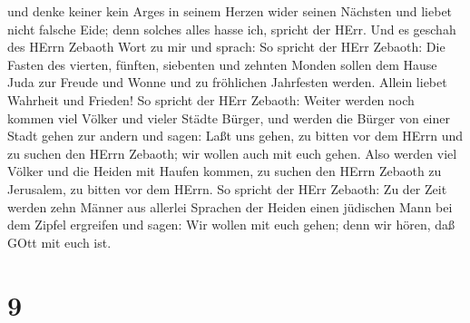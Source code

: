  und denke keiner kein Arges in seinem Herzen wider seinen
Nächsten und liebet nicht falsche Eide; denn solches alles hasse ich,
spricht der HErr.  Und es geschah des HErrn Zebaoth Wort zu
mir und sprach:  So spricht der HErr Zebaoth: Die Fasten
des vierten, fünften, siebenten und zehnten Monden sollen dem Hause Juda
zur Freude und Wonne und zu fröhlichen Jahrfesten werden. Allein liebet
Wahrheit und Frieden!  So spricht der HErr Zebaoth: Weiter
werden noch kommen viel Völker und vieler Städte Bürger, 
und werden die Bürger von einer Stadt gehen zur andern und sagen: Laßt
uns gehen, zu bitten vor dem HErrn und zu suchen den HErrn Zebaoth; wir
wollen auch mit euch gehen.  Also werden viel Völker und
die Heiden mit Haufen kommen, zu suchen den HErrn Zebaoth zu Jerusalem,
zu bitten vor dem HErrn.  So spricht der HErr Zebaoth: Zu
der Zeit werden zehn Männer aus allerlei Sprachen der Heiden einen
jüdischen Mann bei dem Zipfel ergreifen und sagen: Wir wollen mit euch
gehen; denn wir hören, daß GOtt mit euch ist.

\hypertarget{section-8}{%
\section{9}\label{section-8}}


